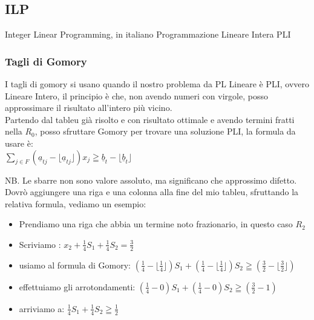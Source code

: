\documentclass{article}
\begin{document}
\subsection{ILP}
Integer Linear Programming, in italiano Programmazione Lineare Intera PLI
\subsubsection{Tagli di Gomory}
I tagli di gomory si usano quando il nostro problema da PL Lineare è PLI, ovvero Lineare Intero, il principio è che, non avendo numeri con virgole, posso approssimare il risultato all'intero più vicino.\\

Partendo dal tableu già risolto e con risultato ottimale e avendo termini fratti nella $R_0$, posso sfruttare Gomory per trovare una soluzione PLI, la formula da usare è:\\
$\displaystyle \sum_{j \in F} ( \underline{a}_{tj} - \lfloor \underline{a}_{tj} \rfloor )x_j \geqq \underline{b}_t -  \lfloor \underline{b}_t \rfloor$

NB. Le sbarre non sono valore assoluto, ma significano che approssimo difetto.\\
Dovrò aggiungere una riga e una colonna alla fine del mio tableu, sfruttando la relativa formula, vediamo un esempio:\\

\begin{center}
\end{center}

\begin{itemize}
\item Prendiamo una riga che abbia un termine noto frazionario, in questo caso $R_2$
\item Scriviamo : $x_2 + \frac{1}{4} S_1 + \frac{1}{4} S_2 = \frac{3}{2}$
\item usiamo al formula di Gomory: $  ( \frac{1}{4} - \lfloor \frac{1}{4} \rfloor )S_1 +  ( \frac{1}{4} - \lfloor \frac{1}{4} \rfloor )S_2 \geqq ( \frac{3}{2} - \lfloor \frac{3}{2} \rfloor )$
\item effettuiamo gli arrotondamenti: $  ( \frac{1}{4} - 0 )S_1 +  ( \frac{1}{4} - 0 )S_2 \geqq ( \frac{3}{2} - 1 )$
\item arriviamo a: $\frac{1}{4}S_1 + \frac{1}{4}S_2 \geqq \frac{1}{2}$
\end{itemize}
\end{document}
